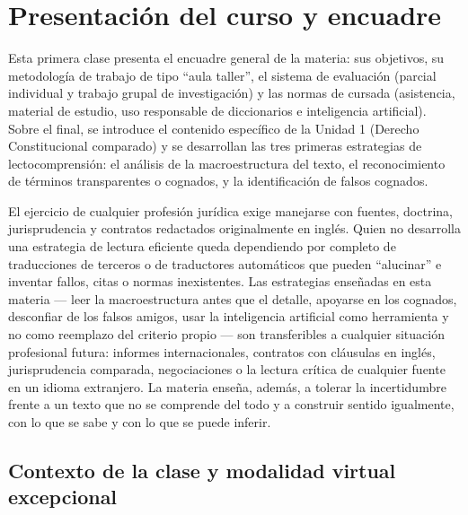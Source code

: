 \documentclass[12pt,oneside]{book}
\begin{document}
\tableofcontents

\chapter{Presentación del curso y encuadre}

Esta primera clase presenta el encuadre general de la materia: sus objetivos, su metodología de trabajo de tipo ``aula taller'', el sistema de evaluación (parcial individual y trabajo grupal de investigación) y las normas de cursada (asistencia, material de estudio, uso responsable de diccionarios e inteligencia artificial). Sobre el final, se introduce el contenido específico de la Unidad 1 (Derecho Constitucional comparado) y se desarrollan las tres primeras estrategias de lectocomprensión: el análisis de la macroestructura del texto, el reconocimiento de términos transparentes o cognados, y la identificación de falsos cognados.

\begin{important}
El ejercicio de cualquier profesión jurídica exige manejarse con fuentes, doctrina, jurisprudencia y contratos redactados originalmente en inglés. Quien no desarrolla una estrategia de lectura eficiente queda dependiendo por completo de traducciones de terceros o de traductores automáticos que pueden ``alucinar'' e inventar fallos, citas o normas inexistentes. Las estrategias enseñadas en esta materia --- leer la macroestructura antes que el detalle, apoyarse en los cognados, desconfiar de los falsos amigos, usar la inteligencia artificial como herramienta y no como reemplazo del criterio propio --- son transferibles a cualquier situación profesional futura: informes internacionales, contratos con cláusulas en inglés, jurisprudencia comparada, negociaciones o la lectura crítica de cualquier fuente en un idioma extranjero. La materia enseña, además, a tolerar la incertidumbre frente a un texto que no se comprende del todo y a construir sentido igualmente, con lo que se sabe y con lo que se puede inferir.
\end{important}

\section{Contexto de la clase y modalidad virtual excepcional}
\end{document}
